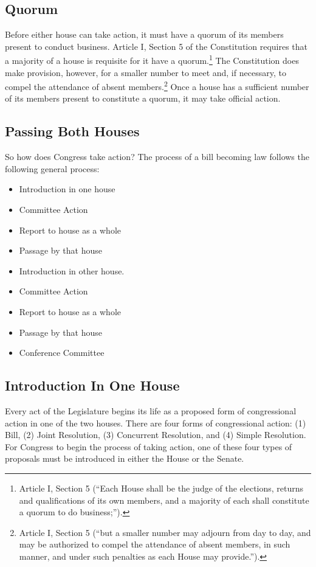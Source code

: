 \subsection{Quorum}
Before either house can take action, it must have a quorum of its members present to conduct business.
Article I, Section 5 of the Constitution requires that a majority of a house is requisite for it have a quorum.\footnote{Article I, Section 5 (``Each House shall be the judge of the elections, returns and qualifications of its own members, and a majority of each shall constitute a quorum to do business;'').}
The Constitution does make provision, however, for a smaller number to meet and, if necessary, to compel the attendance of absent members.\footnote{Article I, Section 5 (``but a smaller number may adjourn from day to day, and may be authorized to compel the attendance of absent members, in such manner, and under such penalties as each House may provide.'').}
Once a house has a sufficient number of its members present to constitute a quorum, it may take official action.

\subsection{Passing Both Houses}
So how does Congress take action?  The process of a bill becoming law follows the following general process:

\begin{itemize}
\item Introduction in one house
\item Committee Action
\item Report to house as a whole
\item Passage by that house
\item Introduction in other house.
\item Committee Action
\item Report to house as a whole
\item Passage by that house
\item Conference Committee
\end{itemize}

\subsection{Introduction In One House}
Every act of the Legislature begins its life as a proposed form of congressional action in one of the two houses.
There are four forms of congressional action: (1) Bill,  (2) Joint Resolution, (3) Concurrent Resolution, and (4) Simple Resolution.  For Congress to begin the process of taking action, one of these four types of proposals must be introduced in either the House or the Senate.

